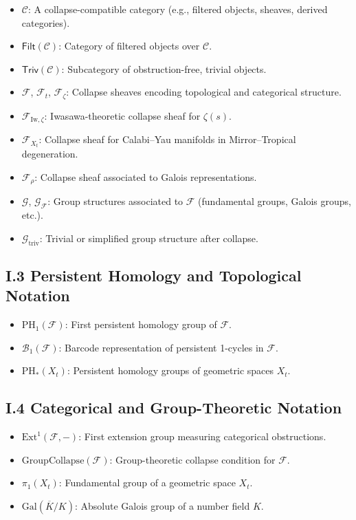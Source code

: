 \documentclass[11pt]{article}
\begin{document}
\begin{itemize}
    \item $\mathcal{C}$: A collapse-compatible category (e.g., filtered objects, sheaves, derived categories).
    \item $\mathsf{Filt}(\mathcal{C})$: Category of filtered objects over $\mathcal{C}$.
    \item $\mathsf{Triv}(\mathcal{C})$: Subcategory of obstruction-free, trivial objects.
    \item $\mathcal{F}$, $\mathcal{F}_t$, $\mathcal{F}_{\zeta}$: Collapse sheaves encoding topological and categorical structure.
    \item $\mathcal{F}_{\mathrm{Iw}, \zeta}$: Iwasawa-theoretic collapse sheaf for $\zeta(s)$.
    \item $\mathcal{F}_{X_t}$: Collapse sheaf for Calabi–Yau manifolds in Mirror–Tropical degeneration.
    \item $\mathcal{F}_\rho$: Collapse sheaf associated to Galois representations.
    \item $\mathcal{G}$, $\mathcal{G}_{\mathcal{F}}$: Group structures associated to $\mathcal{F}$ (fundamental groups, Galois groups, etc.).
    \item $\mathcal{G}_{\mathrm{triv}}$: Trivial or simplified group structure after collapse.
\end{itemize}

\subsection*{I.3 Persistent Homology and Topological Notation}

\begin{itemize}
    \item $\mathrm{PH}_1(\mathcal{F})$: First persistent homology group of $\mathcal{F}$.
    \item $\mathcal{B}_1(\mathcal{F})$: Barcode representation of persistent 1-cycles in $\mathcal{F}$.
    \item $\mathrm{PH}_*(X_t)$: Persistent homology groups of geometric spaces $X_t$.
\end{itemize}

\subsection*{I.4 Categorical and Group-Theoretic Notation}

\begin{itemize}
    \item $\mathrm{Ext}^1(\mathcal{F}, -)$: First extension group measuring categorical obstructions.
    \item $\mathrm{GroupCollapse}(\mathcal{F})$: Group-theoretic collapse condition for $\mathcal{F}$.
    \item $\pi_1(X_t)$: Fundamental group of a geometric space $X_t$.
    \item $\mathrm{Gal}(\overline{K}/K)$: Absolute Galois group of a number field $K$.
\end{itemize}
\end{document}
